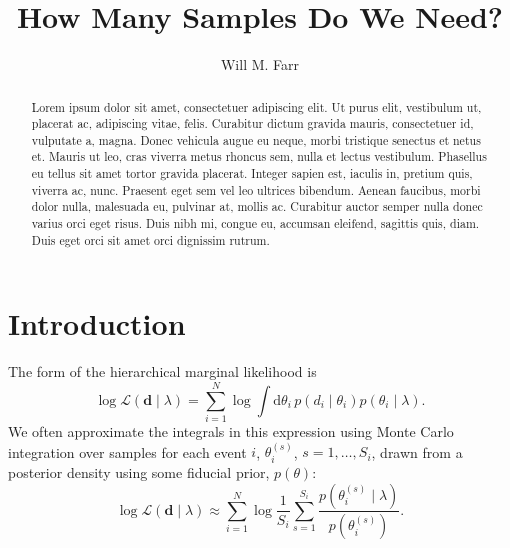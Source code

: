 \documentclass[modern]{aastex631}
\newcommand{\dd}{\mathrm{d}}
\begin{document}
\title{How Many Samples Do We Need?}

\author[0000-0003-1540-8562]{Will M. Farr}

\begin{abstract}
    Lorem ipsum dolor sit amet, consectetuer adipiscing elit.
    Ut purus elit, vestibulum ut, placerat ac, adipiscing vitae, felis.
    Curabitur dictum gravida mauris, consectetuer id, vulputate a, magna.
    Donec vehicula augue eu neque, morbi tristique senectus et netus et.
    Mauris ut leo, cras viverra metus rhoncus sem, nulla et lectus vestibulum.
    Phasellus eu tellus sit amet tortor gravida placerat.
    Integer sapien est, iaculis in, pretium quis, viverra ac, nunc.
    Praesent eget sem vel leo ultrices bibendum.
    Aenean faucibus, morbi dolor nulla, malesuada eu, pulvinar at, mollis ac.
    Curabitur auctor semper nulla donec varius orci eget risus.
    Duis nibh mi, congue eu, accumsan eleifend, sagittis quis, diam.
    Duis eget orci sit amet orci dignissim rutrum.
\end{abstract}

\section{Introduction}
\label{sec:intro}

The form of the hierarchical marginal likelihood is 
\begin{equation}
    \log \mathcal{L}\left( \mathbf{d} \mid \lambda \right) = \sum_{i=1}^{N} \log \int \dd \theta_i \, p\left( d_i \mid \theta_i \right) p\left( \theta_i \mid \lambda \right).
\end{equation}
We often approximate the integrals in this expression using Monte Carlo
integration over samples for each event $i$, $\theta_{i}^{(s)}$, $s = 1, \ldots,
S_i$, drawn from a posterior density using some fiducial prior, $p\left( \theta
\right)$:
\begin{equation}
    \log \mathcal{L}\left( \mathbf{d} \mid \lambda \right) \approx \sum_{i=1}^{N} \log \frac{1}{S_i} \sum_{s=1}^{S_i} \frac{p\left( \theta_i^{(s)} \mid \lambda \right)}{p\left( \theta_i^{(s)} \right)} .
\end{equation}


\end{document}
